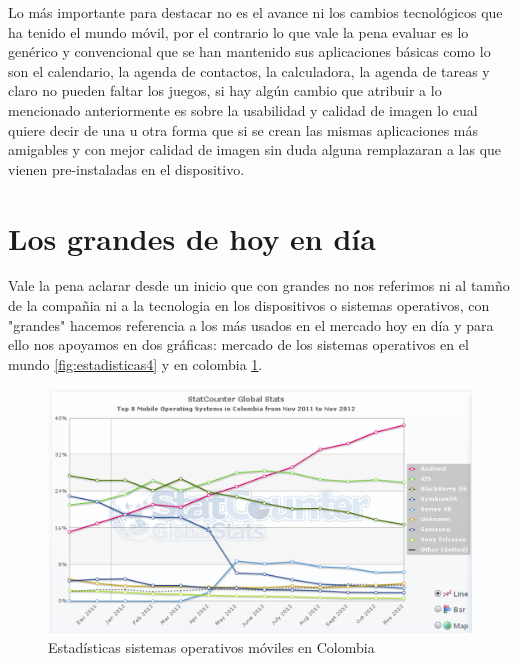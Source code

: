 \documentclass[11pt]{book}
\begin{document}
Lo más importante para destacar no es el avance ni los cambios tecnológicos que ha tenido el mundo móvil, por el contrario lo que vale la pena evaluar es lo genérico y convencional que se han mantenido sus aplicaciones básicas como lo son el calendario, la agenda de contactos, la calculadora, la agenda de tareas y claro no pueden faltar los juegos, si hay algún cambio que atribuir a lo mencionado anteriormente es sobre la usabilidad y calidad de imagen lo cual quiere decir de una u otra forma que si se crean las mismas aplicaciones más amigables y con mejor calidad de imagen sin duda alguna remplazaran a las que vienen pre-instaladas en el dispositivo.

\section{Los grandes de hoy en día}
Vale la pena aclarar desde un inicio que con grandes no nos referimos ni al tamño de la compañia ni a la tecnologia en los dispositivos o sistemas operativos, con "grandes" hacemos referencia a los más usados en el mercado hoy en día y para ello nos apoyamos en dos gráficas: mercado de los sistemas operativos en el mundo \ref{fig:estadisticas4} y en colombia \ref{fig:estadisticas3}.


\begin{figure}[H]
  \centering
    \includegraphics[width=1.0\textwidth]{estadisticas_3}
  \caption{Estadísticas sistemas operativos móviles en Colombia}
  \label{fig:estadisticas3}
\end{figure}
\end{document}
